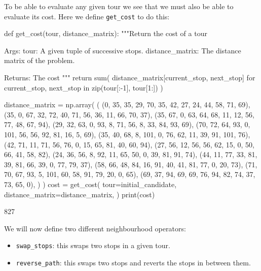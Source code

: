 \begin{pyout}
[0, 7, 12, 5, 11, 3, 9, 2, 8, 10, 4, 1, 6, 0]
\end{pyout}

To be able to evaluate any given tour we see that we must also be able to
evaluate its cost. Here we define \texttt{get_cost} to do this:

\begin{pyin}
def get_cost(tour, distance_matrix):
    """Return the cost of a tour

    Args:
        tour: A given tuple of successive stops.
        distance_matrix: The distance matrix of the problem.

    Returns:
        The cost
    """
    return sum(
        distance_matrix[current_stop, next_stop]
        for current_stop, next_stop in
        zip(tour[:-1], tour[1:])
    )
\end{pyin}

\begin{pyin}
distance_matrix = np.array(
    (
        (0, 35, 35, 29, 70, 35, 42, 27, 24, 44, 58, 71, 69),
        (35, 0, 67, 32, 72, 40, 71, 56, 36, 11, 66, 70, 37),
        (35, 67, 0, 63, 64, 68, 11, 12, 56, 77, 48, 67, 94),
        (29, 32, 63, 0, 93, 8, 71, 56, 8, 33, 84, 93, 69),
        (70, 72, 64, 93, 0, 101, 56, 56, 92, 81, 16, 5, 69),
        (35, 40, 68, 8, 101, 0, 76, 62, 11, 39, 91, 101, 76),
        (42, 71, 11, 71, 56, 76, 0, 15, 65, 81, 40, 60, 94),
        (27, 56, 12, 56, 56, 62, 15, 0, 50, 66, 41, 58, 82),
        (24, 36, 56, 8, 92, 11, 65, 50, 0, 39, 81, 91, 74),
        (44, 11, 77, 33, 81, 39, 81, 66, 39, 0, 77, 79, 37),
        (58, 66, 48, 84, 16, 91, 40, 41, 81, 77, 0, 20, 73),
        (71, 70, 67, 93, 5, 101, 60, 58, 91, 79, 20, 0, 65),
        (69, 37, 94, 69, 69, 76, 94, 82, 74, 37, 73, 65, 0),
    )
)
cost = get_cost(
    tour=initial_candidate,
    distance_matrix=distance_matrix,
)
print(cost)
\end{pyin}

\begin{pyout}
827
\end{pyout}

We will now define two different neighbourhood operators:

\begin{itemize}
    \item \texttt{swap_stops}: this swaps two stops in a given tour.
    \item \texttt{reverse_path}: this swaps two stops and reverts the
        stops in between them.
\end{itemize}

